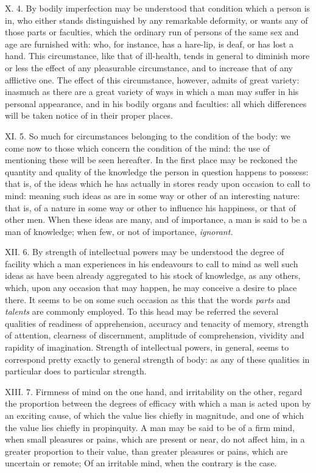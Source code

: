 \documentclass[12pt]{report}
\begin{document}
X. 4. By bodily imperfection may be understood that condition which a
person is in, who either stands distinguished by any remarkable
deformity, or wants any of those parts or faculties, which the ordinary
run of persons of the same sex and age are furnished with: who, for
instance, has a hare-lip, is deaf, or has lost a hand. This
circumstance, like that of ill-health, tends in general to diminish more
or less the effect of any pleasurable circumstance, and to increase that
of any afflictive one. The effect of this circumstance, however, admits
of great variety: inasmuch as there are a great variety of ways in which
a man may suffer in his personal appearance, and in his bodily organs
and faculties: all which differences will be taken notice of in their
proper places.

XI. 5. So much for circumstances belonging to the condition of the body:
we come now to those which concern the condition of the mind: the use of
mentioning these will be seen hereafter. In the first place may be
reckoned the quantity and quality of the knowledge the person in
question happens to possess: that is, of the ideas which he has actually
in stores ready upon occasion to call to mind: meaning such ideas as are
in some way or other of an interesting nature: that is, of a nature in
some way or other to influence his happiness, or that of other men. When
these ideas are many, and of importance, a man is said to be a man of
knowledge; when few, or not of importance, \emph{ignorant.} \emph{}

XII. 6. By strength of intellectual powers may be understood the degree
of facility which a man experiences in his endeavours to call to mind as
well such ideas as have been already aggregated to his stock of
knowledge, as any others, which, upon any occasion that may happen, he
may conceive a desire to place there. It seems to be on some such
occasion as this that the words \emph{parts} and \emph{talents} are
commonly employed. To this head may be referred the several qualities of
readiness of apprehension, accuracy and tenacity of memory, strength of
attention, clearness of discernment, amplitude of comprehension,
vividity and rapidity of imagination. Strength of intellectual powers,
in general, seems to correspond pretty exactly to general strength of
body: as any of these qualities in particular does to particular
strength.

XIII. 7. Firmness of mind on the one hand, and irritability on the
other, regard the proportion between the degrees of efficacy with which
a man is acted upon by an exciting cause, of which the value lies
chiefly in magnitude, and one of which the value lies chiefly in
propinquity. A man may be said to be of a firm mind, when small
pleasures or pains, which are present or near, do not affect him, in a
greater proportion to their value, than greater pleasures or pains,
which are uncertain or remote; Of an irritable mind, when the contrary
is the case.
\end{document}
